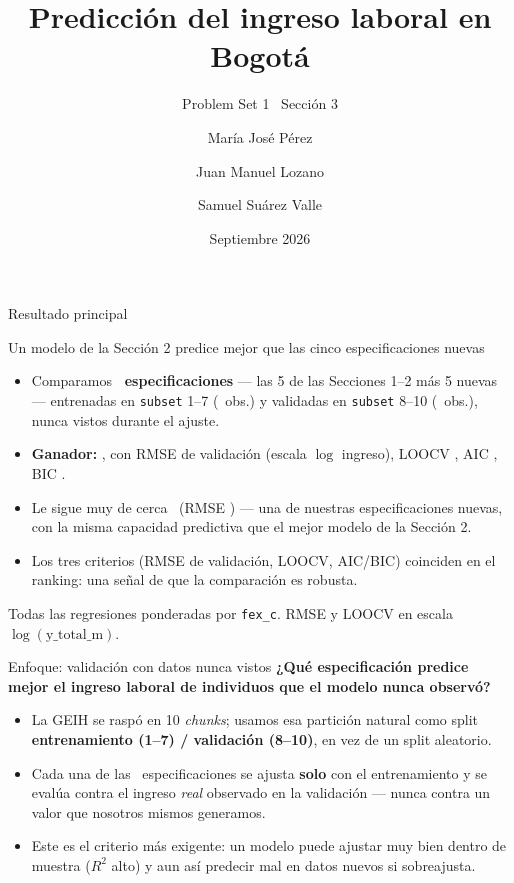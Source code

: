 \documentclass[aspectratio=169]{beamer}
\title[Predicción del ingreso]{Predicción del ingreso laboral en Bogotá}
\subtitle{Problem Set 1 \textbullet\ Sección 3}
\author[Perez, Lozano, Suarez]{María José Pérez \and Juan Manuel Lozano \and Samuel Suárez Valle}
\institute[Uniandes]{MECA 4107 --- Big Data y Machine Learning para Economía Aplicada}
\date{Septiembre 2026}
\begin{document}
\begin{frame}[plain]
  \titlepage
\end{frame}

\begin{frame}{Resultado principal}
  \begin{block}{Un modelo de la Sección 2 predice mejor que las cinco especificaciones nuevas}
    \begin{itemize}
      \item Comparamos \textbf{\PredNModels\ especificaciones} --- las 5 de las
        Secciones 1--2 más 5 nuevas --- entrenadas en \texttt{subset} 1--7
        (\PredNTrain\ obs.) y validadas en \texttt{subset} 8--10
        (\PredNValidation\ obs.), nunca vistos durante el ajuste.
      \item \textbf{Ganador:} \PredBestModel, con RMSE de validación
        \textbf{\PredBestValRMSE} (escala $\log$ ingreso), LOOCV
        \textbf{\PredBestLOOCV}, AIC \textbf{\PredBestAIC}, BIC \textbf{\PredBestBIC}.
      \item Le sigue muy de cerca \PredSecondModel\ (RMSE \PredSecondValRMSE)
        --- una de nuestras especificaciones nuevas, con la misma capacidad
        predictiva que el mejor modelo de la Sección 2.
      \item Los tres criterios (RMSE de validación, LOOCV, AIC/BIC) coinciden en
        el ranking: una señal de que la comparación es robusta.
    \end{itemize}
  \end{block}
  \vfill
  {\footnotesize Todas las regresiones ponderadas por \texttt{fex\_c}. RMSE y
  LOOCV en escala $\log(\text{y\_total\_m})$.}
\end{frame}

\begin{frame}{Enfoque: validación con datos nunca vistos}
  \textbf{¿Qué especificación predice mejor el ingreso laboral de individuos que
  el modelo nunca observó?}
  \vspace{0.4em}
  \begin{itemize}
    \item La GEIH se raspó en 10 \emph{chunks}; usamos esa partición natural
      como split \textbf{entrenamiento (1--7) / validación (8--10)}, en vez de
      un split aleatorio.
    \item Cada una de las \PredNModels\ especificaciones se ajusta \textbf{solo}
      con el entrenamiento y se evalúa contra el ingreso \emph{real} observado
      en la validación --- nunca contra un valor que nosotros mismos generamos.
    \item Este es el criterio más exigente: un modelo puede ajustar muy bien
      dentro de muestra ($R^2$ alto) y aun así predecir mal en datos nuevos si
      sobreajusta.
  \end{itemize}
\end{frame}
\end{document}
